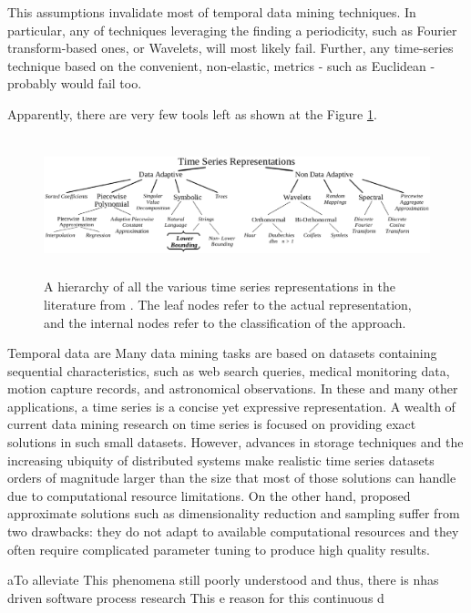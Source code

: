 \documentclass[11pt,oneside]{article}
\numberwithin{equation}{subsection}
\begin{document}
This assumptions invalidate most of temporal data mining techniques. In particular,
any of techniques leveraging the finding a periodicity, such as Fourier transform-based 
ones, or Wavelets, will most likely fail. Further, any time-series technique based 
on the convenient, non-elastic, metrics - such as Euclidean - probably would fail too.

Apparently, there are very few tools left as shown at the
Figure \ref{fig:timeseries-representations}. 

\begin{figure}[tbp]
   \centering
   \includegraphics[height=40mm]{representations.eps}
   \caption{A hierarchy of all the various time series representations in the literature from
       \cite{citeulike:2821475}. The leaf nodes refer to the actual representation, and the internal
            nodes refer to the classification of the approach.}
   \label{fig:timeseries-representations}
\end{figure}



 Temporal data are 
Many data mining tasks are based on datasets containing sequential characteristics, such
as web search queries, medical monitoring data, motion capture records, and astronomical
observations. In these and many other applications, a time series is a concise yet expressive
representation. A wealth of current data mining research on time series is focused on providing exact solutions in such small datasets. However, advances in storage techniques and
the increasing ubiquity of distributed systems make realistic time series datasets orders of
magnitude larger than the size that most of those solutions can handle due to computational
resource limitations. On the other hand, proposed approximate solutions such as dimensionality reduction and sampling suffer from two drawbacks: they do not adapt to available
computational resources and they often require complicated parameter tuning to produce high
quality results.

aTo alleviate This phenomena still poorly understood and thus, there is nhas driven software process research 
This e reason for this continuous d
\end{document}

